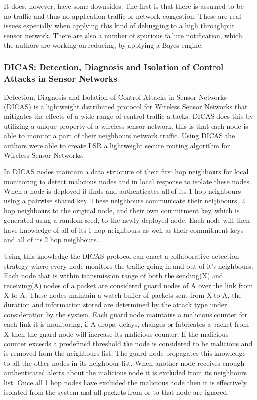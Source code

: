 It does, however, have some downsides. The first is that there is assumed to be no traffic and thus no application traffic or network congestion. These are real issues especially when applying this kind of debugging to a high throughput sensor network. There are also a number of spurious failure notification, which the authors are working on reducing, by applying a Bayes engine.

\subsubsection*{DICAS: Detection, Diagnosis and Isolation of Control Attacks in Sensor Networks}

Detection, Diagnosis and Isolation of Control Attacks in Sensor Networks (DICAS) \cite{dicaspaper} is a lightweight distributed protocol for Wireless Sensor Networks that mitigates the effects of a wide-range of control traffic attacks. DICAS does this by utilizing a unique property of a wireless sensor network, this is that each node is able to monitor a part of their neighbours network traffic. Using DICAS the authors were able to create LSR a lightweight secure routing algorithm for Wireless Sensor Networks.

In DICAS nodes maintain a data structure of their first hop neighbours for local monitoring to detect malicious nodes and in local response to isolate these nodes. When a node is deployed it finds and authenticates all of its 1 hop neighbours using a pairwise shared key. These neighbours communicate their neighbours, 2 hop neighbours to the original node, and their own commitment key, which is generated using a random seed, to the newly deployed node. Each node will then have knowledge of all of its 1 hop neighbours as well as their commitment keys and all of its 2 hop neighbours.

Using this knowledge the DICAS protocol can enact a collaborative detection strategy where every node monitors the traffic going in and out of it's neighbours. Each node that is within transmission range of both the sending(X) and receiving(A) nodes of a packet are considered guard nodes of A over the link from X to A. These nodes maintain a watch buffer of packets sent from X to A, the duration and information stored are determined by the attack type under consideration by the system. Each guard node maintains a malicious counter for each link it is monitoring, if A drops, delays, changes or fabricates a packet from X then the guard node will increase its malicious counter. If the malicious counter exceeds a predefined threshold the node is considered to be malicious and is removed from the neighbours list. The guard node propagates this knowledge to all the other nodes in its neighbour list. When another node receives enough authenticated alerts about the malicious node it is excluded from its neighbours list. Once all 1 hop nodes have excluded the malicious node then it is effectively isolated from the system and all packets from or to that node are ignored.      

